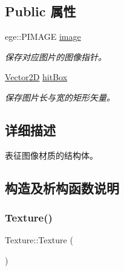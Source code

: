 \subsection*{Public 属性}
\begin{DoxyCompactItemize}
\item 
\mbox{\label{struct_texture_ac4b0ce38664ca13285a077c12277e753}} 
ege\+::\+P\+I\+M\+A\+GE \hyperlink{struct_texture_ac4b0ce38664ca13285a077c12277e753}{image}
\begin{DoxyCompactList}\small\item\em 保存对应图片的图像指针。 \end{DoxyCompactList}\item 
\mbox{\label{struct_texture_a1142de09bebe1683ee67c816953f9ad1}} 
\hyperlink{structbasic__vector2_d}{Vector2D} \hyperlink{struct_texture_a1142de09bebe1683ee67c816953f9ad1}{hit\+Box}
\begin{DoxyCompactList}\small\item\em 保存图片长与宽的矩形矢量。 \end{DoxyCompactList}\end{DoxyCompactItemize}


\subsection{详细描述}
表征图像材质的结构体。 



\subsection{构造及析构函数说明}
\mbox{\label{struct_texture_a66179be276016021e80b1c67c047d4ad}} 
\subsubsection{\texorpdfstring{Texture()}{Texture()}\hspace{0.1cm}{\footnotesize\ttfamily [1/3]}}
{\footnotesize\ttfamily Texture\+::\+Texture (\begin{DoxyParamCaption}{ }\end{DoxyParamCaption})\hspace{0.3cm}{\ttfamily [default]}}



